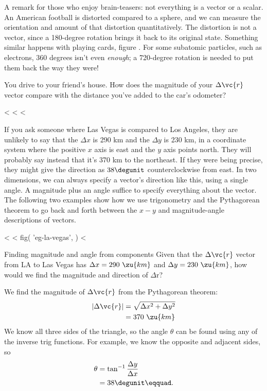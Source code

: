 A remark for those who enjoy brain-teasers: not everything is a vector or a scalar.
An American football is distorted compared to
a sphere, and we can measure the orientation and amount of that distortion quantitatively.
The distortion is not a vector, since
a 180-degree rotation brings it back to its original state. Something similar happens with
playing cards, figure . For some subatomic particles, such as electrons, 360 degrees
isn't even \emph{enough}; a 720-degree rotation is needed to put them back the way they were!

\startdqs

\begin{dq}
You drive to your friend's house. How does the magnitude
of your $\Delta\vc{r}$ vector compare with the distance you've
added to the car's odometer?
\end{dq}

<%
<%
<%

If you ask someone where Las Vegas is compared to Los
Angeles, they are unlikely to say that the $\Delta x$ is 290
km and the $\Delta y$ is 230 km, in a coordinate system
where the positive $x$ axis is east and the $y$ axis points
north. They will probably say instead that it's 370 km to
the northeast. If they were being precise, they might
give the direction as $38\degunit$ counterclockwise from east.
In two dimensions, we can always specify a vector's
direction like this, using a single angle. A magnitude plus
an angle suffice to specify everything about the vector. The
following two examples show how we use trigonometry and the
Pythagorean theorem to go back and forth between the $x-y$
and magnitude-angle descriptions of vectors.

<%
<%
  fig(
    'eg-la-vegas',
  )
<%
\begin{eg}{Finding magnitude and angle from components}\label{eg:la-vegas}
\egquestion Given that the $\Delta \vc{r}$ vector from LA to Las
Vegas has $\Delta x=290\ \zu{km}$ and $\Delta y=230\ \zu{km}$, how would
we find the magnitude and direction of $\Delta $r?

\eganswer We find the magnitude of $\Delta \vc{r}$ from the
Pythagorean theorem:
\begin{align*}
        |\Delta \vc{r}|  &= \sqrt{\Delta x^2 + \Delta y^2}   \\
             &=  370\ \zu{km}
\end{align*}
We know all three sides of the triangle, so the angle
$\theta $ can be found using any of the inverse trig
functions. For example, we know the opposite and adjacent sides, so
\begin{align*}
        \theta       &=  \tan^{-1}\frac{\Delta y}{\Delta x}  \\
             &=  38\degunit\eqquad.
\end{align*}
\end{eg}

